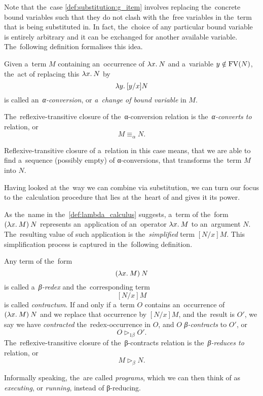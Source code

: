Note that the~case \ref{def:substitution:g_item} involves replacing the~concrete
bound variables such that they do not clash with the~free variables in the~term
that is being substituted in. In fact, the~choice of any particular bound
variable is entirely arbitrary and it can be exchanged for another available
variable. The~following definition formalises this idea.

\begin{definition}
  Given a~term $M$ containing an~occurrence of $\lambda x . \: N$ and a~variable $y
  \notin \mathrm{FV}(N)$, the~act of replacing this $\lambda x . \: N$ by
  \[
    \lambda y . \: [y/x]N
  \]
  is called an~\emph{α-conversion}, or \emph{a~change of bound variable} in $M$.

  The~reflexive-transitive closure of the~α-conversion relation is
  the~\emph{α-converts to} relation, or
  \[
    M \equiv_\alpha N.
  \]
\end{definition}

Reflexive-transitive closure of a~relation in this case means, that we are able
to find a~sequence (possibly empty) of α-conversions, that transforms the~term
$M$ into $N$.

Having looked at the~way we can combine \lts via substitution, we can turn our
focus to the~calculation procedure that lies at the~heart of \lc and gives it
its power.


As the~name in the~\autoref{def:lambda_calculus} suggests, a~term of
the~form $(\lambda x . \: M) \: N$ represents an~application of an~operator $\lambda x . \: M$
to an~argument $N$. The~resulting value of such application is
the~\emph{simplified} term $[N/x]M$. This simplification process is captured in
the~following definition.

\begin{definition}
  Any term of the~form
  \[
    (\lambda x . \: M) \: N
  \]
  is called a~\emph{β-redex} and the~corresponding term
  \[
    [N/x]M
  \]
  is called \emph{contractum}. If and only if a~term $O$ contains an~occurrence
  of $(\lambda x . \: M) \: N$ and we replace that occurrence by $[N/x]M$, and
  the~result is $O'$, we say we have \emph{contracted} the~redex-occurrence in
  $O$, and $O$ \emph{β-contracts} to $O'$, or
  \[
    O \triangleright_{1\beta} O'.
  \]
  The~reflexive-transitive closure of the~β-contracts relation is
  the~\emph{β-reduces to} relation, or
  \[
    M \triangleright_\beta N.
  \]
\end{definition}

Informally speaking, the~\lts are called \emph{programs}, which we can then
think of as \emph{executing}, or \emph{running}, instead of β-reducing.

